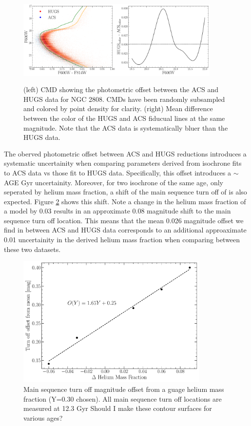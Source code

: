 \begin{figure}
  \centering
  \includegraphics[width=0.90\textwidth]{figures/ngc2808/photometricOffset.pdf}
  \label{fig:offset}
  \caption{(left) CMD showing the photometric offset between the ACS and HUGS data for NGC 2808. CMDs have been randomly subsampled and colored by point density for clarity. (right) Mean difference between the color of the HUGS and ACS fiducual lines at the same magnitude. Note that the ACS data is systematically bluer than the HUGS data.}
\end{figure}

The oberved photometric offset between ACS and HUGS reductions introduces a
systematic uncertainity when comparing parameters derived from isochrone fits
to ACS data vs those fit to HUGS data. Specifically, this offset introduces a
{\color{red}$\sim$AGE Gyr} uncertainity. Moreover, for two isochrone of the
same age, only seperated by helium mass fraction, a shift of the main sequence
turn off of is also expected. Figure \ref{fig:HeMO} shows this shift. Note a change in the helium mass fraction of a model by 0.03 results in an approximate 0.08 magnitude shift to the main sequence turn off location. This means that the mean 0.026 magnitude offset we find in between ACS and HUGS data corresponds to an additional approaximate 0.01 uncertainity in the derived helium mass fraction when comparing between these two datasets. 

\begin{figure}
  \centering
  \includegraphics[width=0.85\textwidth]{figures/ngc2808/HeliumMeanOffset.pdf}
  \caption{Main sequence turn off magnitude offset from a guage helium mass fraction (Y=0.30 chosen). All main sequence turn off locations are measured at 12.3 Gyr {\color{blue} Should I make these contour surfaces for various ages?}}
  \label{fig:HeMO}
\end{figure}
